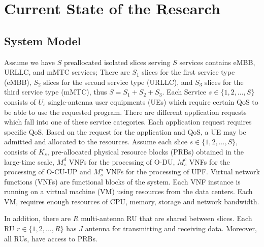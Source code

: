 \documentclass{article}
\begin{document}
\section{Current State of the Research}
\subsection{System Model}
Assume we have $S$ preallocated isolated slices serving $S$ services contains eMBB, URLLC, and mMTC services; There are $S_1$ slices for the first service type (eMBB), $S_2$ slices for the second service type (URLLC), and $S_3$ slices for the third service type (mMTC), thus $S=S_1+S_2+S_3$.
Each Service $s\in \{1,2,...,S\} $ consists of $U_{s}$ single-antenna user equipments (UEs) which require certain QoS to be able to use the requested program.
There are different application requests which fall into one of these service categories. Each application request requires specific QoS. Based on the request for the application and QoS, a UE may be admitted and allocated to the resources.
Assume each slice $s \in \{1,2,...,S \}$, consists of $K_{s}$, pre-allocated physical resource blocks (PRBs)  obtained in the large-time scale, $M_s^{d}$ VNFs for the processing of O-DU, $M_s^{c}$ VNFs for the processing of O-CU-UP and $M_s^{u}$ VNFs for the processing of UPF. 
Virtual network functions (VNFs) are functional blocks of the
system. Each VNF instance is running on a virtual machine (VM) using resources from the data centers. Each VM, requires enough resources of CPU, memory, storage and network bandwidth.

In addition, there are $R$ multi-antenna RU that are shared between slices. Each RU $r \in \{1,2,...,R \}$
has $J$ antenna for transmitting and receiving data. Moreover, all RUs, have access to PRBs.
\end{document}
